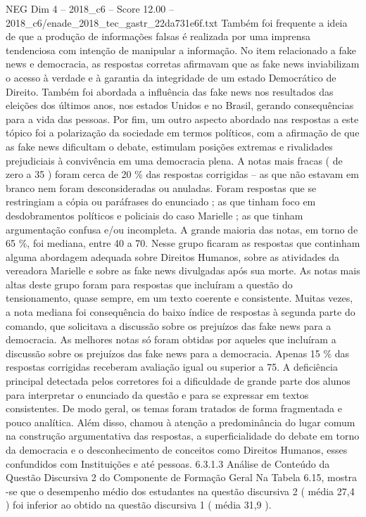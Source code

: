 \begin{textsample}{NEG Dim 4 – 2018\_c6 – Score 12.00 – 2018\_c6/enade\_2018\_tec\_gastr\_22da731e6f.txt}
Também foi frequente a ideia de que a produção de informações falsas é realizada por uma imprensa tendenciosa com intenção de manipular a informação.
No item relacionado a fake news e democracia, as respostas corretas afirmavam que as fake news inviabilizam o acesso à verdade e à garantia da integridade de um estado Democrático de Direito.
Também foi abordada a influência das fake news nos resultados das eleições dos últimos anos, nos estados Unidos e no Brasil, gerando consequências para a vida das pessoas.
Por fim, um outro aspecto abordado nas respostas a este tópico foi a polarização da sociedade em termos políticos, com a afirmação de que as fake news dificultam o debate, estimulam posições extremas e rivalidades prejudiciais à convivência em uma democracia plena.
A notas mais fracas ( de zero a 35 ) foram cerca de 20 \% das respostas corrigidas – as que não estavam em branco nem foram desconsideradas ou anuladas.
Foram respostas que se restringiam a cópia ou paráfrases do enunciado ; as que tinham foco em desdobramentos políticos e policiais do caso Marielle ; as que tinham argumentação confusa e/ou incompleta.
A grande maioria das notas, em torno de 65 \%, foi mediana, entre 40 a 70.
Nesse grupo ficaram as respostas que continham alguma abordagem adequada sobre Direitos Humanos, sobre as atividades da vereadora Marielle e sobre as fake news divulgadas após sua morte.
As notas mais altas deste grupo foram para respostas que incluíram a questão do tensionamento, quase sempre, em um texto coerente e consistente.
Muitas vezes, a nota mediana foi consequência do baixo índice de respostas à segunda parte do comando, que solicitava a discussão sobre os prejuízos das fake news para a democracia.
As melhores notas só foram obtidas por aqueles que incluíram a discussão sobre os prejuízos das fake news para a democracia.
Apenas 15 \% das respostas corrigidas receberam avaliação igual ou superior a 75.
A deficiência principal detectada pelos corretores foi a dificuldade de grande parte dos alunos para interpretar o enunciado da questão e para se expressar em textos consistentes.
De modo geral, os temas foram tratados de forma fragmentada e pouco analítica.
Além disso, chamou à atenção a predominância do lugar comum na construção argumentativa das respostas, a superficialidade do debate em torno da democracia e o desconhecimento de conceitos como Direitos Humanos, esses confundidos com Instituições e até pessoas. 6.3.1.3 Análise de Conteúdo da Questão Discursiva 2 do Componente de Formação Geral Na Tabela 6.15, mostra -se que o desempenho médio dos estudantes na questão discursiva 2 ( média 27,4 ) foi inferior ao obtido na questão discursiva 1 ( média 31,9 ).

\end{textsample}
